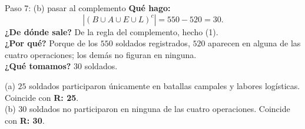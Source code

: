 \documentclass[11pt]{article}
\begin{document}
\begin{sol}
\begin{paso}{Paso 7: (b) pasar al complemento}
\textbf{Qu\'e hago:}
\[
|(B\cup A\cup E\cup L)^{c}| = 550 - 520 = 30 .
\]
\textbf{¿De d\'onde sale?} De la regla del complemento, hecho (1).\\
\textbf{¿Por qu\'e?} Porque de los $550$ soldados registrados, $520$ aparecen en alguna de las cuatro operaciones; los dem\'as no figuran en ninguna.\\
\textbf{¿Qu\'e tomamos?} $30$ soldados.
\end{paso}

\end{sol}

\begin{resp}
(a) $\boxed{25}$ soldados participaron \'unicamente en batallas campales y labores log\'isticas. Coincide con \textbf{R: 25}.\\
(b) $\boxed{30}$ soldados no participaron en ninguna de las cuatro operaciones. Coincide con \textbf{R: 30}.
\end{resp}
\end{document}
